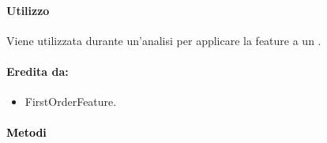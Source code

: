 \paragraph{Utilizzo\\} Viene utilizzata durante un'analisi per applicare la feature\g{} a un \dataset{}.

\paragraph{Eredita da:}
\begin{itemize}
	\item FirstOrderFeature.
\end{itemize}

\paragraph{\textcolor{black}{Metodi\\}}
